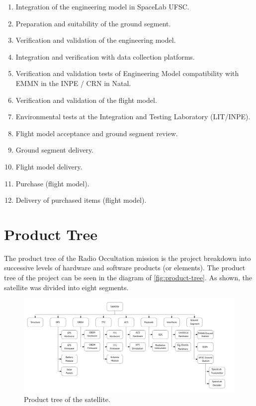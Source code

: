 \begin{enumerate}
    \item Integration of the engineering model in SpaceLab UFSC.
    \item Preparation and suitability of the ground segment.
    \item Verification and validation of the engineering model.
    \item Integration and verification with data collection platforms.
    \item Verification and validation tests of Engineering Model compatibility with EMMN in the INPE / CRN in Natal.
    \item Verification and validation of the flight model.
    \item Environmental tests at the Integration and Testing Laboratory (LIT/INPE).
    \item Flight model acceptance and ground segment review.
    \item Ground segment delivery.
    \item Flight model delivery.
    \item Purchase (flight model).
    \item Delivery of purchased items (flight model).
\end{enumerate}

\section{Product Tree}

The product tree of the Radio Occultation mission is the project breakdown into successive levels of hardware and software products (or elements). The product tree of the project can be seen in the diagram of \autoref{fig:product-tree}. As shown, the satellite was divided into eight segments.

\begin{figure}[!ht]
    \begin{center}
        \includegraphics[width=\textwidth]{figures/product-tree.pdf}
        \caption{Product tree of the satellite.}
        \label{fig:product-tree}
    \end{center}
\end{figure}

